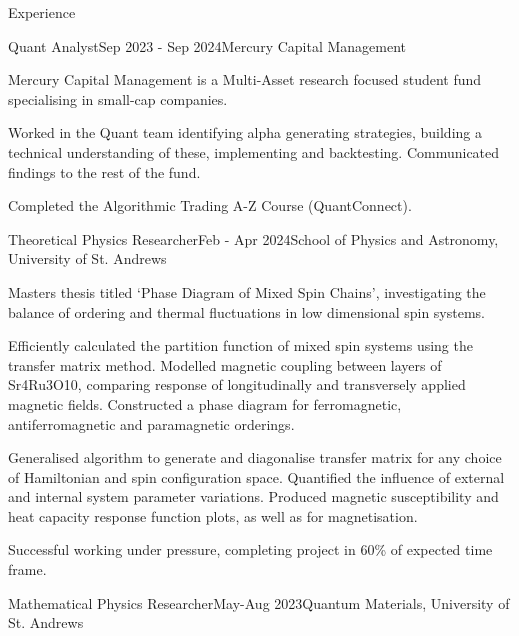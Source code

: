 \documentclass{resume} %
\begin{document}

\begin{rSection}{Experience}
\begin{rSubsection}{Quant Analyst}{Sep 2023 - Sep 2024}{Mercury Capital Management}

    \item{Mercury Capital Management is a Multi-Asset research focused student fund specialising in small-cap companies.}
    \item{Worked in the Quant team identifying alpha generating strategies, building a technical understanding of these, implementing and backtesting. Communicated findings to the rest of the fund.}
    \item{Completed the Algorithmic Trading A-Z Course (QuantConnect).}
    
\end{rSubsection}
\begin{rSubsection}{Theoretical Physics Researcher}{Feb - Apr 2024}{School of Physics and Astronomy, University of St. Andrews}

    \item {Masters thesis titled `Phase Diagram of Mixed Spin Chains', investigating the balance of ordering and thermal fluctuations in low dimensional spin systems.}
    \item{Efficiently calculated the partition function of mixed spin systems using the transfer matrix method. Modelled magnetic coupling between layers of Sr4Ru3O10, comparing response of longitudinally and transversely applied magnetic fields. Constructed a phase diagram for ferromagnetic, antiferromagnetic and paramagnetic orderings.}
    \item {Generalised algorithm to generate and diagonalise transfer matrix for any choice of Hamiltonian and spin configuration space. Quantified the influence of external and internal system parameter variations. Produced magnetic susceptibility and heat capacity response function plots, as well as for magnetisation. }
    \item {Successful working under pressure, completing project in 60\% of expected time frame.}

\end{rSubsection}

\begin{rSubsection}{Mathematical Physics Researcher}{May-Aug 2023}{Quantum Materials, University of St. Andrews}


\end{rSubsection}
\end{rSection}
\end{document}
